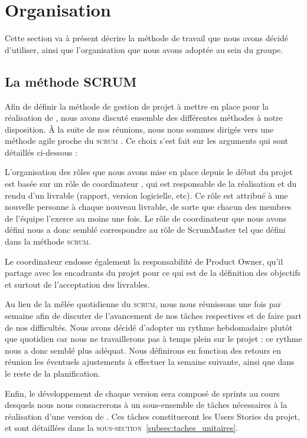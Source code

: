\section{Organisation}
    \label{sec:orga}
    Cette section va à présent décrire la méthode de travail que nous avons décidé d'utiliser, ainsi que l'organisation que nous avons adoptée au sein du groupe.

    \subsection{La méthode SCRUM}
    \label{subsec:scrum}
        Afin de définir la méthode de gestion de projet à mettre en place pour la réalisation de \glasir{}, nous avons discuté ensemble des différentes méthodes à notre disposition. À la suite de nos réunions, nous nous sommes dirigés vers une méthode agile proche du \og \textsc{scrum} \fg{}. Ce choix s'est fait sur les arguments qui sont détaillés ci-dessous :

        L'organisation des rôles que nous avons mise en place depuis le début du projet est basée sur un rôle de \og coordinateur \fg{}, qui est responsable de la réalisation et du rendu d'un livrable (rapport, version logicielle, etc). Ce rôle est attribué à une nouvelle personne à chaque nouveau livrable, de sorte que chacun des membres de l'équipe l'exerce au moins une fois. Le rôle de coordinateur que nous avons défini nous a donc semblé correspondre au rôle de ScrumMaster tel que défini dans la méthode \textsc{scrum}.

        Le coordinateur endosse également la responsabilité de Product Owner, qu'il partage avec les encadrants du projet pour ce qui est de la définition des objectifs et surtout de l'acceptation des livrables.

        Au lieu de la mêlée quotidienne du \textsc{scrum}, nous nous réunissons une fois par semaine afin de discuter de l'avancement de nos tâches respectives et de faire part de nos difficultés. Nous avons décidé d'adopter un rythme hebdomadaire plutôt que quotidien car nous ne travaillerons pas à temps plein sur le projet : ce rythme nous a donc semblé plus adéquat. Nous définirons en fonction des retours en réunion les éventuels ajustements à effectuer la semaine suivante, ainsi que dans le reste de la planification.

        Enfin, le développement de chaque version sera composé de sprints au cours desquels nous nous consacrerons à un sous-ensemble de tâches nécessaires à la réalisation d'une version de \glasir{}. Ces tâches constitueront les Users Stories du projet, et sont détaillées dans la \textsc{sous-section}~\ref{subsec:taches_unitaires}.  
    
